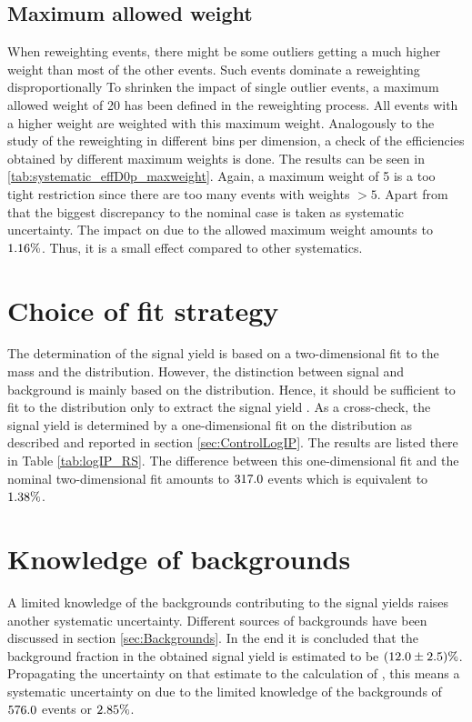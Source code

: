 \subsection{Maximum allowed weight}
When reweighting events, there might be some outliers getting a much higher weight than most of the other events.
Such events dominate a reweighting disproportionally
To shrinken the impact of single outlier events, a maximum allowed weight of 20 has been defined in the reweighting process.
All events with a higher weight are weighted with this maximum weight.
Analogously to the study of the reweighting in different bins per dimension, a check of the efficiencies obtained by different maximum weights is done.
The results can be seen in \ref{tab:systematic_effD0p_maxweight}.
Again, a maximum weight of 5 is a too tight restriction since there are too many events with weights $> 5$.
Apart from that the biggest discrepancy to the nominal case is taken as systematic uncertainty.
The impact on \R due to the allowed maximum weight amounts to $1.16\%$.
Thus, it is a small effect compared to other systematics.


\section{Choice of fit strategy}
The determination of the \LbToDpmunuX signal yield is based on a two-dimensional fit to the \Dz\proton mass and the \logIP distribution.
However, the distinction between signal and background is mainly based on the \logIP distribution.
Hence, it should be sufficient to fit to the \logIP distribution only to extract the signal yield \NDp.
As a cross-check, the signal yield \NDp is determined by a one-dimensional fit on the \logIP distribution as described and reported in section \ref{sec:ControlLogIP}.
The results are listed there in Table \ref{tab:logIP_RS}.
The difference between this one-dimensional fit and the nominal two-dimensional fit amounts to $317.0$ events which is equivalent to $1.38\%$.

\section{Knowledge of backgrounds}
A limited knowledge of the backgrounds contributing to the signal yields raises another systematic uncertainty.
Different sources of backgrounds have been discussed in section \ref{sec:Backgrounds}.
In the end it is concluded that the background fraction in the obtained signal yield \NDp is estimated to be $(12.0 \pm 2.5)\%$.
Propagating the uncertainty on that estimate to the calculation of \R, this means a systematic uncertainty on \NDp due to the limited knowledge of the backgrounds of $576.0$ events or $2.85\%$.

